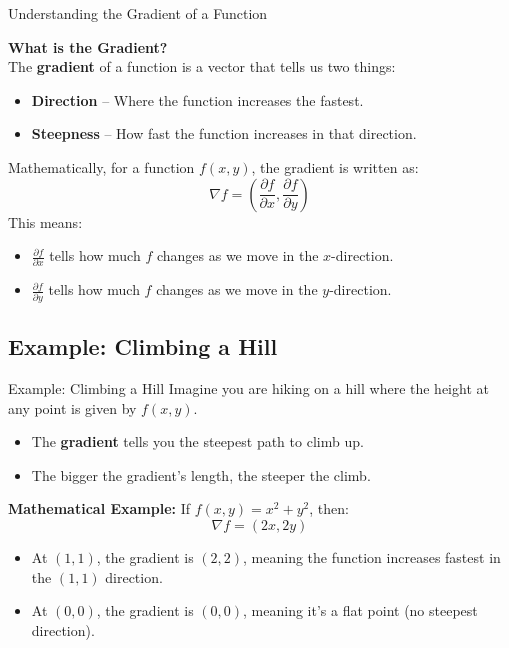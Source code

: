 \documentclass{beamer}
\begin{document}
\begin{frame}{Understanding the Gradient of a Function}

    \textbf{What is the Gradient?} \\
    The \textbf{gradient} of a function is a vector that tells us two things:
    \begin{itemize}
        \item \textbf{Direction} – Where the function increases the fastest.
        \item \textbf{Steepness} – How fast the function increases in that direction.
    \end{itemize}

    Mathematically, for a function \( f(x, y) \), the gradient is written as:
    \[
    \nabla f = \left( \frac{\partial f}{\partial x}, \frac{\partial f}{\partial y} \right)
    \]
    This means:
    \begin{itemize}
        \item \( \frac{\partial f}{\partial x} \) tells how much \( f \) changes as we move in the \( x \)-direction.
        \item \( \frac{\partial f}{\partial y} \) tells how much \( f \) changes as we move in the \( y \)-direction.
    \end{itemize}

\end{frame}

\subsection{Example: Climbing a Hill}

\begin{frame}{Example: Climbing a Hill}
    Imagine you are hiking on a hill where the height at any point is given by \( f(x, y) \).
    \begin{itemize}
        \item The \textbf{gradient} tells you the steepest path to climb up.
        \item The bigger the gradient’s length, the steeper the climb.
    \end{itemize}

    \textbf{Mathematical Example:} If \( f(x, y) = x^2 + y^2 \), then:
    \[
    \nabla f = (2x, 2y)
    \]
    \begin{itemize}
        \item At \( (1,1) \), the gradient is \( (2,2) \), meaning the function increases fastest in the \((1,1)\) direction.
        \item At \( (0,0) \), the gradient is \( (0,0) \), meaning it’s a flat point (no steepest direction).
    \end{itemize}
    
    \centering

\end{frame}
\end{document}
